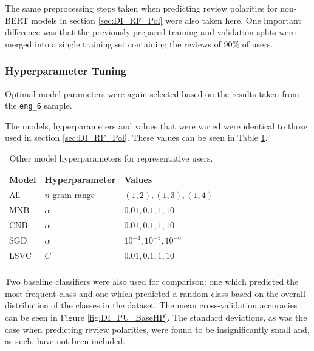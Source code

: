 The same preprocessing steps taken when predicting review polarities for non-BERT models in section \ref{sec:DI_RF_Pol} were also taken here. One important difference was that the previously prepared training and validation splits were merged into a single training set containing the reviews of 90\% of users.

\subsubsection{Hyperparameter Tuning}

Optimal model parameters were again selected based on the results taken from the \texttt{eng\_6} sample.

The models, hyperparameters and values that were varied were identical to those used in section \ref{sec:DI_RF_Pol}. These values can be seen in Table \ref{tab:DI_PU_BaseHP}.

\begin{table}[ht]
    \centering
    \begin{tabular}{l l l}
        \toprule
        \textbf{Model} & \textbf{Hyperparameter} & \textbf{Values}\\\midrule
        All & $n$-gram range & $(1, 2), (1, 3), (1, 4)$\\
        MNB & $\alpha$ & $0.01, 0.1, 1, 10$\\
        CNB & $\alpha$ & $0.01, 0.1, 1, 10$\\
        SGD & $\alpha$ & $10^{-4}, 10^{-5}, 10^{-6}$\\
        LSVC & $C$ & $0.01, 0.1, 1, 10$\\
        \bottomrule\\
    \end{tabular}
    \caption{Other model hyperparameters for representative users.}
    \label{tab:DI_PU_BaseHP}
\end{table}

Two baseline classifiers were also used for comparison: one which predicted the most frequent class and one which predicted a random class based on the overall distribution of the classes in the dataset. The mean cross-validation accuracies can be seen in Figure \ref{fig:DI_PU_BaseHP}. The standard deviations, as was the case when predicting review polarities, were found to be insignificantly small and, as such, have not been included.

